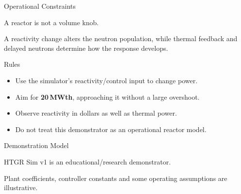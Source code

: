 \documentclass[aspectratio=169]{beamer}
\begin{document}

\begin{frame}{Operational Constraints}

    A reactor is not a volume knob.

    A reactivity change alters the neutron population, while thermal feedback
    and delayed neutrons determine how the response develops.

    \vspace{1em}

    \begin{block}{Rules}

        \begin{itemize}

            \item Use the simulator's reactivity/control input to change power.

            \item Aim for \textbf{20\,MWth}, approaching it without a
                  large overshoot.

            \item Observe reactivity in dollars as well as thermal power.

            \item Do not treat this demonstrator as an operational reactor model.

        \end{itemize}

    \end{block}

    \begin{alertblock}{Demonstration Model}

        HTGR Sim v1 is an educational/research demonstrator.

        Plant coefficients, controller constants and some operating assumptions
        are illustrative.

    \end{alertblock}

\end{frame}


\end{document}
